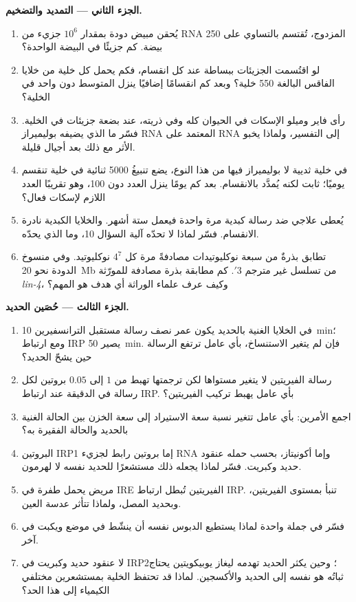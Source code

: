 \begin{problem}
\medskip
\noindent\textbf{الجزء الثاني --- التمديد والتضخيم.}
\begin{enumerate}[resume]
  \item يُحقن مبيض دودة بمقدار $10^{6}$ جزيء من RNA المزدوج، تُقتسم
        بالتساوي على \num{250} بيضة. كم جزيئًا في البيضة الواحدة؟
  \item لو اقتُسمت الجزيئات ببساطة عند كل انقسام، فكم يحمل كل خلية
        من خلايا الفاقس البالغة \num{550} خلية؟ وبعد كم انقسامًا
        إضافيًا ينزل المتوسط دون واحد في الخلية؟
  \item رأى فاير وميلو الإسكات في الحيوان كله وفي ذريته، عند بضعة
        جزيئات في الخلية. فسّر ما الذي يضيفه بوليميراز RNA المعتمد
        على RNA إلى التفسير، ولماذا يخبو الأثر مع ذلك بعد أجيال
        قليلة.
  \item في خلية ثديية لا بوليميراز فيها من هذا النوع، يضع تنبيغُ
         \num{5000} ثنائية في خلية تنقسم يوميًا؛  ثابت لكنه
        يُمدَّد بالانقسام. بعد كم يومًا ينزل العدد دون \num{100}،
        وهو تقريبًا العدد اللازم لإسكات فعال؟
  \item يُعطى  علاجي ضد رسالة كبدية مرة واحدة فيعمل ستة أشهر.
        والخلايا الكبدية نادرة الانقسام. فسّر لماذا لا تحدّه آلية
        السؤال 10، وما الذي يحدّه.
  \item تطابق بذرةٌ من سبعة نوكليوتيدات مصادفةً مرة كل
        $4^{7}$ نوكليوتيد. وفي منسوخ الدودة نحو
        \qty{20}{Mb} من تسلسل غير مترجم 3$'$. كم مطابقة بذرة مصادفة
        للمورّثة \emph{lin-4}، وكيف عرف علماء الوراثة أي هدف هو المهم؟
\end{enumerate}

\medskip
\noindent\textbf{الجزء الثالث --- حُصَين الحديد.}
\begin{enumerate}[resume]
  \item في الخلايا الغنية بالحديد يكون عمر نصف رسالة مستقبل
        الترانسفيرين \qty{10}{min}؛ ومع ارتباط IRP يصير \qty{50}{min}.
        فإن لم يتغير الاستنساخ، بأي عامل ترتفع الرسالة حين يشحّ
        الحديد؟
  \item رسالة الفيريتين لا يتغير مستواها لكن ترجمتها تهبط من $1$ إلى
        $0.05$ بروتين لكل رسالة في الدقيقة عند ارتباط IRP. بأي عامل
        يهبط تركيب الفيريتين؟
  \item اجمع الأمرين: بأي عامل تتغير نسبة سعة الاستيراد إلى سعة
        الخزن بين الحالة الغنية بالحديد والحالة الفقيرة به؟
  \item البروتين IRP1 إما بروتين رابط لجزيء RNA وإما أكونيتاز، بحسب
        حمله عنقود حديد وكبريت. فسّر لماذا يجعله ذلك مستشعرًا
        للحديد نفسه لا لهرمون.
  \item مريض يحمل طفرة في IRE الفيريتين تُبطل ارتباط IRP. تنبأ
        بمستوى الفيريتين، وبحديد المصل، ولماذا تتأثر عدسة العين.
  \item فسّر في جملة واحدة لماذا يستطيع الدبوس نفسه أن ينشّط في موضع
        ويكبت في آخر.
  \item لا عنقود حديد وكبريت في IRP2؛ وحين يكثر الحديد تهدمه ليغاز
        يوبيكويتين يحتاج ثباتُه هو نفسه إلى الحديد والأكسجين. لماذا
        قد تحتفظ الخلية بمستشعرين مختلفي الكيمياء إلى هذا الحد؟
\end{enumerate}


\end{problem}
